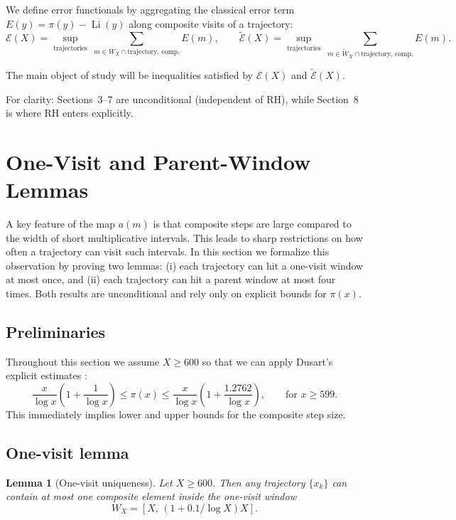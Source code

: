 \documentclass[11pt]{article}
\theoremstyle{plain}
\newtheorem{lemma}[theorem]{Lemma}
\theoremstyle{definition}
\theoremstyle{remark}
\begin{document}
We define error functionals by aggregating the classical error term $E(y)=\pi(y)-\operatorname{Li}(y)$ along composite visits of a trajectory:
\[
\mathcal E(X)=\sup_{\text{trajectories}}\ \sum_{m\in W_X \cap \text{trajectory, comp.}} E(m),\qquad
\widetilde{\mathcal E}(X)=\sup_{\text{trajectories}}\ \sum_{m\in \widetilde W_X \cap \text{trajectory, comp.}} E(m).
\]

The main object of study will be inequalities satisfied by $\mathcal E(X)$ and $\widetilde{\mathcal E}(X)$.

 For clarity: Sections~3--7 are unconditional (independent of RH), while Section~8 is where RH enters explicitly.

\section{One-Visit and Parent-Window Lemmas}\label{sec:onevisit}

A key feature of the map $a(m)$ is that composite steps are large compared to the width of short multiplicative intervals. This leads to sharp restrictions on how often a trajectory can visit such intervals. In this section we formalize this observation by proving two lemmas: (i) each trajectory can hit a one-visit window at most once, and (ii) each trajectory can hit a parent window at most four times. Both results are unconditional and rely only on explicit bounds for $\pi(x)$.

\subsection{Preliminaries}

Throughout this section we assume $X \geq 600$ so that we can apply Dusart’s explicit estimates \cite[Theorem~1.10]{Dusart2010}:
\begin{equation}\label{eq:dusart}
\frac{x}{\log x}\left(1 + \frac{1}{\log x}\right) \leq \pi(x) \leq \frac{x}{\log x}\left(1 + \frac{1.2762}{\log x}\right), \qquad \text{for } x \geq 599.
\end{equation}
This immediately implies lower and upper bounds for the composite step size.

\subsection{One-visit lemma}

\begin{lemma}[One-visit uniqueness]\label{lem:onevisit}
Let $X \geq 600$. Then any trajectory $\{x_k\}$ can contain at most one composite element inside the one-visit window
\[
W_X = \left[X,\,(1+0.1/\log X)X\right].
\]
\end{lemma}
\end{document}
